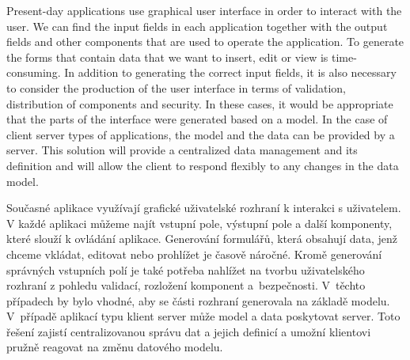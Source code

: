 \documentclass[11pt,twoside,a4paper]{book}
\begin{document}



 
\abstractpage
Present-day applications use graphical user interface in order to interact with the user. We can find the input fields in each application together with the output fields and other components that are used to operate the application. To generate the forms that contain data that we want to insert, edit or view is time-consuming. In addition to generating the correct input fields, it is also necessary to consider the production of the user interface in terms of validation, distribution of components and security. In these cases, it would be appropriate that the parts of the interface were generated based on a model. In the case of client server types of applications, the model and the data can be provided by a server. This solution will provide a centralized data management and its definition and will allow the client to respond flexibly to any changes in the data model.


\baselineskip

\noindent
Současné aplikace využívají grafické uživatelské rozhraní k interakci s uživatelem. V každé aplikaci můžeme najít vstupní pole, výstupní pole a další komponenty, které slouží k ovládání aplikace. Generování formulářů, která obsahují data, jenž chceme vkládat, editovat nebo prohlížet je časově náročné. Kromě generování správných vstupních polí je také potřeba nahlížet na tvorbu uživatelského rozhraní z pohledu validací, rozložení komponent a~bezpečnosti. V~těchto případech by bylo vhodné, aby se části rozhraní generovala na základě modelu. V~případě aplikací typu klient server může model a data poskytovat server. Toto řešení zajistí centralizovanou správu dat a jejich definicí a umožní klientovi pružně reagovat na změnu datového modelu.


\tableofcontents



\listoffigures
\end{document}
